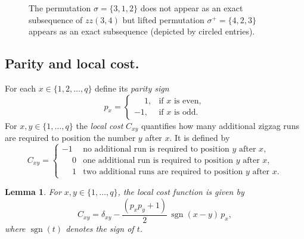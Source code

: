 \documentclass[a4paper,12pt]{article}
\newtheorem{lemma}[theorem]{Lemma}
\theoremstyle{definition}
\numberwithin{equation}{section}
\begin{document}
\readlist{}
\readlist{}

\begin{figure}[H]
\centering
{}
\caption{ The permutation $\sigma = \{ 3,1,2\}$ does not appear as an exact subsequence of $zz(3,4)$ but lifted permutation $\sigma^+ = \{4,2,3\}$ appears as an exact subsequence (depicted by circled entries).}\label{liftedfig}
\end{figure}




\subsection{Parity and local cost.}\label{sec:cost}
For each $x \in \{1,2,\dots,q\}$ define its \emph{parity sign}
\[
p_x =
\begin{cases}
\phantom{-}1, & \text{if $x$ is even},\\[3pt]
-1, & \text{if $x$ is odd.}
\end{cases}
\]
For $x,y \in \{1,\dots,q\}$ the \emph{local cost} $C_{xy}$ quantifies how many additional
zigzag runs are required to position the number $y$ after $x$. It is defined by
\[
C_{xy}=\begin{cases}
    -1 &\text{no additional run is required to position $y$ after $x$,}\\[3pt]
    \phantom{-}0 &\text{one additional run is required to position $y$ after $x$,}\\[3pt]
    \phantom{-}1 &\text{two additional runs are required to position $y$ after $x$.}
\end{cases}
\]

\begin{lemma}
For $x,y\in\{1,\dots,q\}$, the local cost function is given by
\begin{equation}\label{cxy}
C_{xy}
   = \delta_{xy}
     -\frac{(p_x p_y + 1)}{2}\,
     \operatorname{sgn}(x-y)\,p_x,
\end{equation}
where $\operatorname{sgn}(t)$ denotes the sign of $t$.
\end{lemma}
\end{document}
